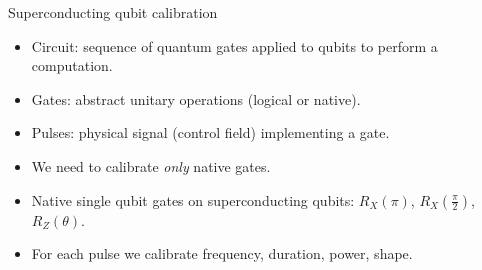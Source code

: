 \documentclass[aspectratio=169,10pt]{beamer}
\begin{document}
\begin{frame}{Superconducting qubit calibration}
  \begin{itemize}
    \item<1-> Circuit: sequence of quantum gates applied to qubits to perform a computation.
    \item<2-> Gates: abstract unitary operations (logical or native).
    \item<3-> Pulses: physical signal (control field) implementing a gate.
  \end{itemize}
\vspace{0.75em}
  \vspace{0.25em}
  \begin{itemize}
    \item<2-> We need to calibrate \textit{only} native gates.
    \item<2-> Native single qubit gates on superconducting qubits: $R_X(\pi)$, $R_X(\frac{\pi}{2})$, $R_Z(\theta)$.
    \item<3-> For each pulse we calibrate frequency, duration, power, shape.
  \end{itemize}
\end{frame}
\end{document}
